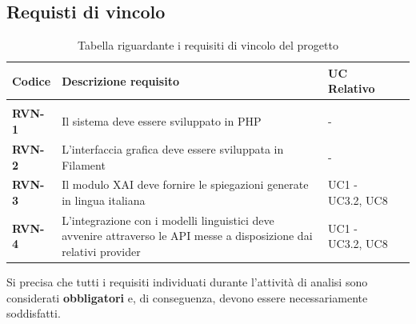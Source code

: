 \subsection{Requisti di vincolo}
\keepXColumns
{}
    \begin{longtable}{|l|p{}|l|l|}
        \hline
        \rowcolor{gold}
        \textbf{Codice} & \textbf{Descrizione requisito} & \textbf{UC Relativo} \\
        \hline
        \endhead

        \hline
        \rowcolor{white}
        \caption{Tabella riguardante i requisiti di vincolo del progetto} \label{tab:requisiti_vincolo} \\
        \endlastfoot 

        \textbf{RVN-1} & Il sistema deve essere sviluppato in PHP & - \\
        \hline
        \textbf{RVN-2} & L'interfaccia grafica deve essere sviluppata in Filament & -\\
        \hline
        \textbf{RVN-3} & Il modulo XAI deve fornire le spiegazioni generate in lingua italiana & UC1 - UC3.2, UC8\\
        \hline
        \textbf{RVN-4} & L'integrazione con i modelli linguistici deve avvenire attraverso le API messe a disposizione dai relativi provider & UC1 - UC3.2, UC8\\
        \hline
    \end{longtable}

Si precisa che tutti i requisiti individuati durante l'attività di analisi sono considerati \textbf{obbligatori} e, di conseguenza, devono essere necessariamente 
soddisfatti.
\newpage